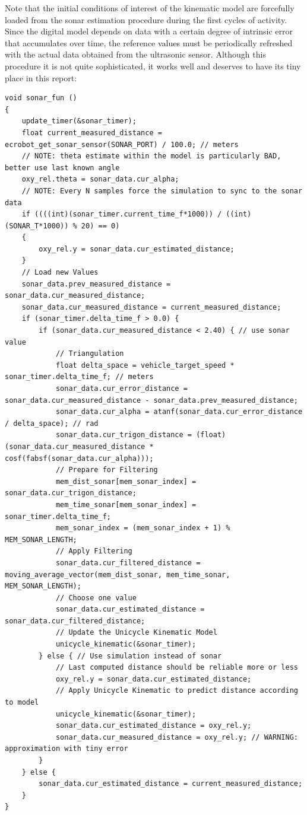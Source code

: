 Note that the initial conditions of interest of the kinematic model are forcefully loaded from the sonar estimation procedure during the first cycles of activity. Since the digital model depends on data with a certain degree of intrinsic error that accumulates over time, the reference values must be periodically refreshed with the actual data obtained from the ultrasonic sensor. Although this procedure it is not quite sophisticated, it works well and deserves to have its tiny place in this report:

\begin{lstlisting}
void sonar_fun ()
{
    update_timer(&sonar_timer);
    float current_measured_distance = ecrobot_get_sonar_sensor(SONAR_PORT) / 100.0; // meters
    // NOTE: theta estimate within the model is particularly BAD, better use last known angle
    oxy_rel.theta = sonar_data.cur_alpha;
    // NOTE: Every N samples force the simulation to sync to the sonar data
    if ((((int)(sonar_timer.current_time_f*1000)) / ((int)(SONAR_T*1000)) % 20) == 0)
    {
        oxy_rel.y = sonar_data.cur_estimated_distance;
    }
    // Load new Values
    sonar_data.prev_measured_distance = sonar_data.cur_measured_distance;
    sonar_data.cur_measured_distance = current_measured_distance;
    if (sonar_timer.delta_time_f > 0.0) {
        if (sonar_data.cur_measured_distance < 2.40) { // use sonar value
            // Triangulation
            float delta_space = vehicle_target_speed * sonar_timer.delta_time_f; // meters
            sonar_data.cur_error_distance = sonar_data.cur_measured_distance - sonar_data.prev_measured_distance;
            sonar_data.cur_alpha = atanf(sonar_data.cur_error_distance / delta_space); // rad
            sonar_data.cur_trigon_distance = (float) (sonar_data.cur_measured_distance * cosf(fabsf(sonar_data.cur_alpha)));
            // Prepare for Filtering
            mem_dist_sonar[mem_sonar_index] = sonar_data.cur_trigon_distance;
            mem_time_sonar[mem_sonar_index] = sonar_timer.delta_time_f;
            mem_sonar_index = (mem_sonar_index + 1) % MEM_SONAR_LENGTH;
            // Apply Filtering
            sonar_data.cur_filtered_distance = moving_average_vector(mem_dist_sonar, mem_time_sonar, MEM_SONAR_LENGTH);
            // Choose one value
            sonar_data.cur_estimated_distance = sonar_data.cur_filtered_distance;
            // Update the Unicycle Kinematic Model
            unicycle_kinematic(&sonar_timer);
        } else { // Use simulation instead of sonar
            // Last computed distance should be reliable more or less
            oxy_rel.y = sonar_data.cur_estimated_distance;
            // Apply Unicycle Kinematic to predict distance according to model
            unicycle_kinematic(&sonar_timer);
            sonar_data.cur_estimated_distance = oxy_rel.y;
            sonar_data.cur_measured_distance = oxy_rel.y; // WARNING: approximation with tiny error
        }
    } else {
        sonar_data.cur_estimated_distance = current_measured_distance;
    }
}
\end{lstlisting}

